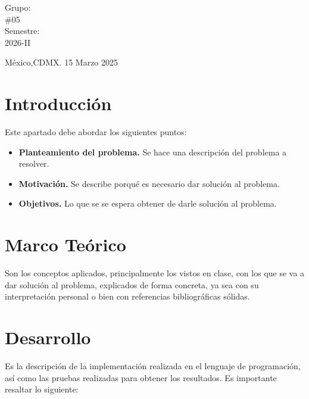 \documentclass[letterpaper,12pt,oneside]{article}
\begin{document}
\begin{titlepage}
\begin{center}
\begin{center}
				\bigskip
				
				Grupo: \\
				\#05\\
				Semestre: \\
                2026-II
			\end{center}
			
			\vfill
			
			\begin{center}
				{México,CDMX. 15 Marzo 2025}\\
			\end{center}
			\cleardoublepage
		\end{center}
	\end{titlepage}
 
\tableofcontents
\clearpage
    

\section{Introducción} %

Este apartado debe abordar los siguientes puntos:

\begin{itemize}
    \item \textbf{Planteamiento del problema.} Se hace una descripción del problema a resolver.
    \item \textbf{Motivación.} Se describe porqué es necesario dar solución al problema.
    \item \textbf{Objetivos.} Lo que se se espera obtener de darle solución al problema.
\end{itemize}

\section{Marco Teórico}

Son los conceptos aplicados, principalmente los vistos en clase, con los que se va a dar solución al problema, explicados de forma concreta, ya sea con su interpretación personal o bien con referencias bibliográficas sólidas.~\cite{10.5555/576122}

\section{Desarrollo}

Es la descripción de la implementación realizada en el lenguaje de programación, así como las pruebas realizadas para obtener los resultados. Es importante resaltar lo siguiente:
\end{document}
